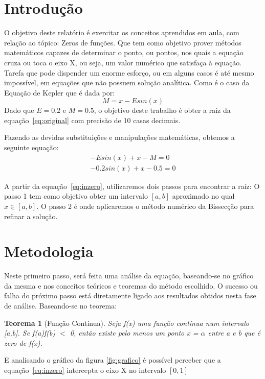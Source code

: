 \documentclass[12pt, hidelinks]{article}
\begin{document}
\section{Introdução}

O objetivo deste relatório é exercitar os conceitos aprendidos em aula, com relação ao tópico: Zeros de funções. Que tem como objetivo prover métodos matemáticos capazes de determinar o ponto, ou pontos, nos quais a equação cruza ou toca o eixo X, ou seja, um valor numérico que satisfaça à equação. Tarefa que pode dispender um enorme esforço, ou em alguns casos é até mesmo impossível, em equações que não possuem solução analítica. Como é o caso da Equação de Kepler que é dada por:
\begin{equation} \label{eq:original}
  M = x - E sin(x)
\end{equation}
Dado que $E = 0.2$ e $M = 0.5$, o objetivo deste trabalho é obter a raíz da equação~\eqref{eq:original} com precisão de 10 casas decimais.

Fazendo as devidas substituições e manipulações matemáticas, obtemos a seguinte equação:
\begin{eqnarray}\label{eq:inzero}
  -E sin(x) + x - M = 0 \nonumber\\
  -0.2sin(x) + x - 0.5 = 0
\end{eqnarray}

A partir da equação~\eqref{eq:inzero}, utilizaremos dois passos para encontrar a raíz: O passo 1 tem como objetivo obter um intervalo $[a,b]$ aproximado no qual $x \in [a,b]$. O passo 2 é onde aplicaremos o método numérico da Bissecção para refinar a solução.

\section{Metodologia}

Neste primeiro passo, será feita uma análise da equação, baseando-se no gráfico da mesma e nos conceitos teóricos e teoremas do método escolhido. O sucesso ou falha do próximo passo está diretamente ligado aos resultados obtidos nesta fase de análise.
Baseando-se no teorema:
\newtheorem{ambiente}{Teorema}
\begin{ambiente}[Função Contínua]\label{teo:teorema}
  Seja f(x) uma função contínua num intervalo [a,b]. Se f(a)f(b) $<$ 0, então existe pelo menos um ponto
  x = $\alpha$ entre a e b que é zero de f(x).
\end{ambiente}

E analisando o gráfico da figura \ref{fig:grafico} é possível perceber que a equação~\eqref{eq:inzero} intercepta o eixo X no intervalo $[0,1]$
\end{document}
